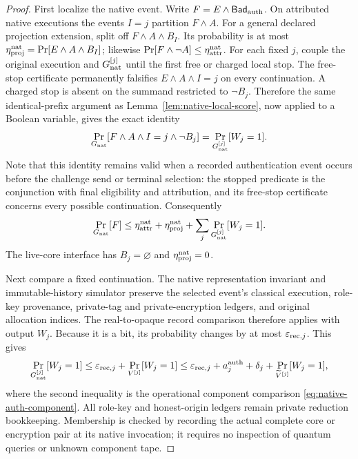 \begin{proof}
First localize the native event.  Write
$F=E\wedge\mathsf{Bad}_{\rm auth}$.  On attributed native executions the
events $I=j$ partition $F\wedge A$.  For a general declared projection
extension, split off $F\wedge A\wedge B_I$.  Its probability is at most
$\eta_{\rm proj}^{\rm nat}=\Pr[E\wedge A\wedge B_I]$; likewise
$\Pr[F\wedge\neg A]\le\eta_{\rm attr}^{\rm nat}$.
For each fixed $j$, couple the original execution and $G_{\rm nat}^{[j]}$
until the first free or charged local stop.  The free-stop certificate
permanently falsifies $E\wedge A\wedge I=j$ on every continuation.  A charged
stop is absent on the summand restricted to $\neg B_j$.  Therefore the same
identical-prefix argument as Lemma~\ref{lem:native-local-score}, now applied to a
Boolean variable, gives the exact identity
\[
 \Pr_{G_{\rm nat}}[F\wedge A\wedge I=j\wedge\neg B_j]
 =\Pr_{G_{\rm nat}^{[j]}}[W_j=1].
\]
Note that this identity remains valid when a recorded authentication event occurs
before the challenge send or terminal selection: the stopped predicate is the conjunction
with final eligibility and attribution, and its free-stop certificate
concerns every possible continuation.  Consequently
\begin{equation}
 \Pr_{G_{\rm nat}}[F]
 \le\eta_{\rm attr}^{\rm nat}+\eta_{\rm proj}^{\rm nat}
    +\sum_j\Pr_{G_{\rm nat}^{[j]}}[W_j=1].
 \label{eq:native-auth-localization}
\end{equation}
The live-core interface has $B_j=\varnothing$ and
$\eta_{\rm proj}^{\rm nat}=0$.

Next compare a fixed continuation.  The native representation invariant and
immutable-history simulator preserve the selected event's classical
execution, role-key provenance, private-tag and private-encryption ledgers,
and original allocation indices.  The real-to-opaque record comparison
therefore applies with output $W_j$.  Because it is a bit, its probability
changes by at most $\varepsilon_{{\rm rec},j}$.  This gives
\[
 \Pr_{G_{\rm nat}^{[j]}}[W_j=1]
 \le\varepsilon_{{\rm rec},j}
       +\Pr_{V^{[j]}}[W_j=1]
 \le\varepsilon_{{\rm rec},j}+a_j^{\rm auth}+\delta_j
       +\Pr_{\widetilde V^{[j]}}[W_j=1],
\]
where the second inequality is the operational component comparison
\eqref{eq:native-auth-component}.  All role-key and honest-origin ledgers
remain private reduction bookkeeping.  Membership is checked by recording
the actual complete core or encryption pair at its native invocation; it
requires no inspection of quantum queries or unknown component tape.


\end{proof}
